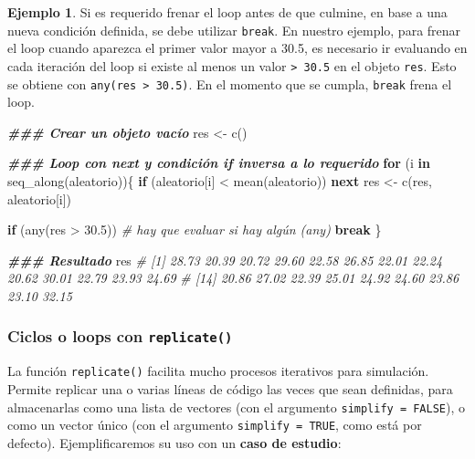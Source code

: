 \documentclass[
]{article}
\newenvironment{Shaded}{\begin{snugshade}}{\end{snugshade}}
\newcommand{\CommentTok}[1]{\textcolor[rgb]{0.56,0.35,0.01}{\textit{#1}}}
\newcommand{\ControlFlowTok}[1]{\textcolor[rgb]{0.13,0.29,0.53}{\textbf{#1}}}
\newcommand{\DocumentationTok}[1]{\textcolor[rgb]{0.56,0.35,0.01}{\textbf{\textit{#1}}}}
\newcommand{\FloatTok}[1]{\textcolor[rgb]{0.00,0.00,0.81}{#1}}
\newcommand{\FunctionTok}[1]{\textcolor[rgb]{0.00,0.00,0.00}{#1}}
\newcommand{\NormalTok}[1]{#1}
\newcommand{\OtherTok}[1]{\textcolor[rgb]{0.56,0.35,0.01}{#1}}
\newcommand{\SpecialCharTok}[1]{\textcolor[rgb]{0.00,0.00,0.00}{#1}}
\theoremstyle{definition}
\theoremstyle{definition}
\newtheorem{example}{Ejemplo}[section]
\theoremstyle{definition}
\theoremstyle{definition}
\theoremstyle{remark}
\begin{document}
\begin{example}

Si es requerido frenar el loop antes de que culmine, en base a una nueva condición definida, se debe utilizar \texttt{break}. En nuestro ejemplo, para frenar el loop cuando aparezca el primer valor mayor a 30.5, es necesario ir evaluando en cada iteración del loop si existe al menos un valor \texttt{\textgreater{}\ 30.5} en el objeto \texttt{res}. Esto se obtiene con \texttt{any(res\ \textgreater{}\ 30.5)}. En el momento que se cumpla, \texttt{break} frena el loop.

\begin{Shaded}
\begin{Highlighting}[]
\DocumentationTok{\#\#\# Crear un objeto vacío }
\NormalTok{res }\OtherTok{\textless{}{-}} \FunctionTok{c}\NormalTok{()}

\DocumentationTok{\#\#\# Loop con next y condición if inversa a lo requerido}
\ControlFlowTok{for}\NormalTok{ (i }\ControlFlowTok{in} \FunctionTok{seq\_along}\NormalTok{(aleatorio))\{}
  \ControlFlowTok{if}\NormalTok{ (aleatorio[i] }\SpecialCharTok{\textless{}} \FunctionTok{mean}\NormalTok{(aleatorio)) }
    \ControlFlowTok{next}
\NormalTok{  res }\OtherTok{\textless{}{-}} \FunctionTok{c}\NormalTok{(res, aleatorio[i])}
  
  \ControlFlowTok{if}\NormalTok{ (}\FunctionTok{any}\NormalTok{(res }\SpecialCharTok{\textgreater{}} \FloatTok{30.5}\NormalTok{)) }\CommentTok{\# hay que evaluar si hay algún (any)}
    \ControlFlowTok{break}
\NormalTok{\}}

\DocumentationTok{\#\#\# Resultado}
\NormalTok{res}
\CommentTok{\#  [1] 28.73 20.39 20.72 29.60 22.58 26.85 22.01 22.24 20.62 30.01 22.79 23.93 24.69}
\CommentTok{\# [14] 20.86 27.02 22.39 25.01 24.92 24.60 23.86 23.10 32.15}
\end{Highlighting}
\end{Shaded}

\end{example}

\hypertarget{ciclos-o-loops-con-replicate}{%
\subsubsection{\texorpdfstring{Ciclos o loops con \texttt{replicate()}}{Ciclos o loops con replicate()}}\label{ciclos-o-loops-con-replicate}}

La función \texttt{replicate()} facilita mucho procesos iterativos para simulación. Permite replicar una o varias líneas de código las veces que sean definidas, para almacenarlas como una lista de vectores (con el argumento \texttt{simplify\ =\ FALSE}), o como un vector único (con el argumento \texttt{simplify\ =\ TRUE}, como está por defecto). Ejemplificaremos su uso con un \textbf{caso de estudio}:
\end{document}
